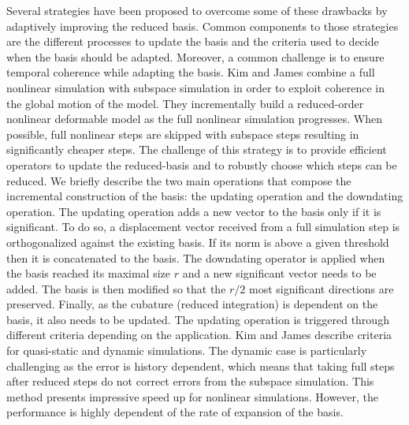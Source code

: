 Several strategies have been proposed to overcome some of these drawbacks by adaptively improving the reduced basis. Common components to those strategies are the different processes to update the basis and the criteria used to decide when the basis should be adapted. Moreover, a common challenge is to ensure temporal coherence while adapting the basis.
Kim and James \cite{Kim2009Skipping} combine a full nonlinear simulation with subspace simulation in order to exploit coherence in the global motion of the model.
They incrementally build a reduced-order nonlinear deformable model as the full nonlinear simulation progresses. When possible, full nonlinear steps are skipped with subspace steps resulting in significantly cheaper steps. The challenge of this strategy is to provide efficient operators to update the reduced-basis and to robustly choose which steps can be reduced. We briefly describe the two main operations that compose the incremental construction of the basis: the updating operation and the downdating operation. The updating operation adds a new vector to the basis only if it is significant. To do so, a displacement vector received from a full simulation step is orthogonalized against the existing basis. If its norm is above a given threshold then it is concatenated to the basis. The downdating operator is applied when the basis reached its maximal size $r$ and a new significant vector needs to be added. The basis is then modified so that the $r/2$ most significant directions are preserved. Finally, as the cubature (reduced integration) is dependent on the basis, it also needs to be updated. The updating operation is triggered through different criteria depending on the application. Kim and James describe criteria for quasi-static and dynamic simulations. The dynamic case is particularly challenging as the error is history dependent, which means that taking full steps after reduced steps do not correct errors from the subspace simulation. This method presents impressive speed up for nonlinear simulations. However, the performance is highly dependent of the rate of expansion of the basis.

